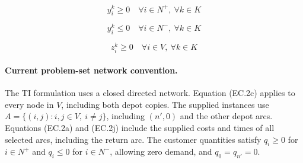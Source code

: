 \documentclass{article}
\begin{document}
\begin{equation}
y_i^k \ge 0
\quad \forall i \in N^{+},\ \forall k \in K
\tag{EC.2n}
\end{equation}

\begin{equation}
y_i^k \le 0
\quad \forall i \in N^{-},\ \forall k \in K
\tag{EC.2o}
\end{equation}

\begin{equation}
z_i^k \ge 0
\quad \forall i \in V,\ \forall k \in K
\tag{EC.2p}
\end{equation}

\paragraph{Current problem-set network convention.}
The TI formulation uses a closed directed network. Equation (EC.2c) applies to every node in $V$, including both depot copies. The supplied instances use $A=\{(i,j):i,j\in V,\ i\ne j\}$, including $(n',0)$ and the other depot arcs. Equations (EC.2a) and (EC.2j) include the supplied costs and times of all selected arcs, including the return arc. The customer quantities satisfy $q_i\ge0$ for $i\in N^+$ and $q_i\le0$ for $i\in N^-$, allowing zero demand, and $q_0=q_{n'}=0$. 
\end{document}
